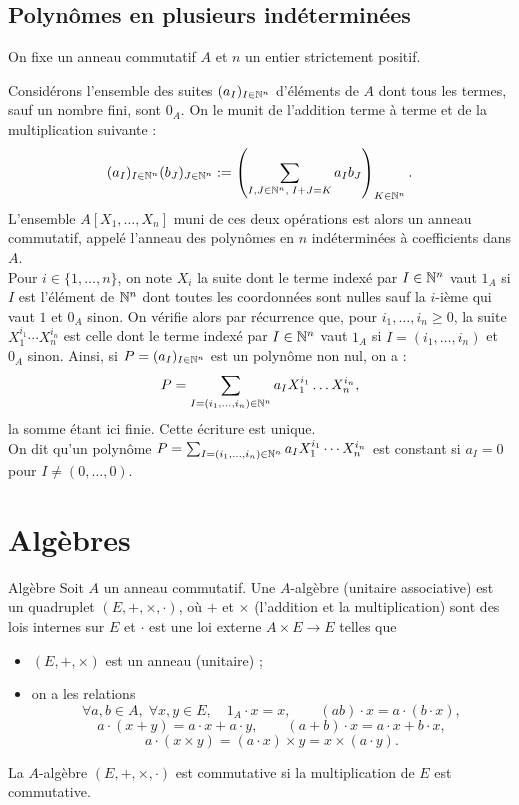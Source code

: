 \documentclass[]{report}
\begin{document}
\subsection{Polynômes en plusieurs indéterminées}

On fixe un anneau commutatif $A$ et $n$ un entier strictement positif.

\begin{df}{}{}
    Considérons l'ensemble des suites $(a_I)_{I \in \mathbb{N}^n}$ d'éléments de $A$ dont tous les termes, sauf un nombre fini, sont $0_A$. On le munit de l'addition terme à terme et de la multiplication suivante :
    \[(a_I)_{I \in \mathbb{N}^n} (b_J)_{J \in \mathbb{N}^n} := \left(\sum_{I, J \in \mathbb{N}^n, \; I + J = K} a_I b_J\right)_{K \in \mathbb{N}^n}.\]
    L'ensemble $A[X_1, \ldots, X_n]$ muni de ces deux opérations est alors un anneau commutatif, appelé l'anneau des polynômes en $n$ indéterminées à coefficients dans $A$.\\
    Pour $i \in \{1, \ldots, n\}$, on note $X_i$ la suite dont le terme indexé par $I \in \mathbb{N}^n$ vaut $1_A$ si $I$ est l'élément de $\mathbb{N}^n$ dont toutes les coordonnées sont nulles sauf la $i$-ième qui vaut $1$ et $0_A$ sinon. On vérifie alors par récurrence que, pour $i_1, \ldots, i_n \ge 0$, la suite $X_1^{i_1} \cdots X_n^{i_n}$ est celle dont le terme indexé par $I \in \mathbb{N}^n$ vaut $1_A$ si $I = (i_1, \ldots, i_n)$ et $0_A$ sinon. Ainsi, si $P = (a_I)_{I \in \mathbb{N}^n}$ est un polynôme non nul, on a :
    \[P = \sum_{I = (i_1, \dots, i_n) \in \mathbb{N}^n} a_I X_1^{i_1} \dots X_n^{i_n},\]
    la somme étant ici finie. Cette écriture est unique.\\
    On dit qu'un polynôme $P = \sum_{I = (i_1, \ldots, i_n) \in \mathbb{N}^n} a_I X_1^{i_1} \cdots X_n^{i_n}$ est constant si $a_I = 0$ pour $I \neq (0, \ldots, 0)$.
\end{df}

\section{Algèbres}

\begin{df}{Algèbre}{}
    Soit $A$ un anneau commutatif. Une $A$-algèbre (unitaire associative) est un quadruplet $(E, +, \times, \cdot)$, où $+$ et $\times$ (l'addition et la multiplication) sont des lois internes sur $E$ et $\cdot$ est une loi externe $A \times E \rightarrow E$ telles que
    \begin{itemize}
        \item $(E, +, \times)$ est un anneau (unitaire) ;
        \item on a les relations
        \[\forall a, b \in A, \; \forall x, y \in E, \quad 1_A \cdot x = x, \qquad (ab) \cdot x = a \cdot (b \cdot x),\]
        \[a \cdot (x + y) = a \cdot x + a \cdot y, \qquad (a + b) \cdot x = a \cdot x + b \cdot x,\]
        \[a \cdot (x \times y) = (a \cdot x) \times y = x \times (a \cdot y).\]
    \end{itemize}
    La $A$-algèbre $(E, +, \times, \cdot)$ est commutative si la multiplication de $E$ est commutative.
\end{df}
\end{document}
